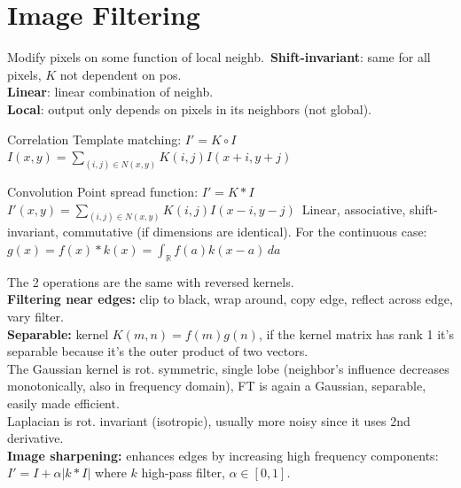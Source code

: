 \documentclass[a4paper,9pt]{article}
\begin{document}
\section{Image Filtering}
Modify pixels on some function of local neighb.\
\textbf{Shift-invariant}: same for all pixels, $K$ not dependent on pos.\\
\textbf{Linear}: linear combination of neighb.\\
\textbf{Local}: output only depends on pixels in its neighbors (not global).\\
\begin{subbox}{Correlation}
Template matching: $I' = K \circ I$\
$I(x, y) = \sum_{(i, j) \in N(x, y)} K(i, j) I(x + i, y + j)$
\end{subbox}
\begin{subbox}{Convolution}
Point spread function: $I' = K * I$\
$I'(x, y) = \sum_{(i, j) \in N(x, y)} K(i, j) I(x - i, y - j)$\
Linear, associative, shift-invariant, commutative (if dimensions are identical). For the continuous case: $g(x) = f(x) * k(x) = \int_{\mathbb{R}} f(a) k(x - a) \, da$
\end{subbox}
The 2 operations are the same with reversed kernels.\\
\textbf{Filtering near edges:} clip to black, wrap around, copy edge, reflect across edge, vary filter.\\
\textbf{Separable:} kernel $K(m, n) = f(m) g(n)$, if the kernel matrix has rank 1 it's separable because it's the outer product of two vectors.\\
The Gaussian kernel is rot. symmetric, single lobe (neighbor's influence decreases monotonically, also in frequency domain), FT is again a Gaussian, separable, easily made efficient.\\
Laplacian is rot. invariant (isotropic), usually more noisy since it uses 2nd derivative.\\
\textbf{Image sharpening:} enhances edges by increasing high frequency components: $I' = I + \alpha \lvert k * I \rvert$ where $k$ high-pass filter, $\alpha \in [0, 1]$.
\end{document}
